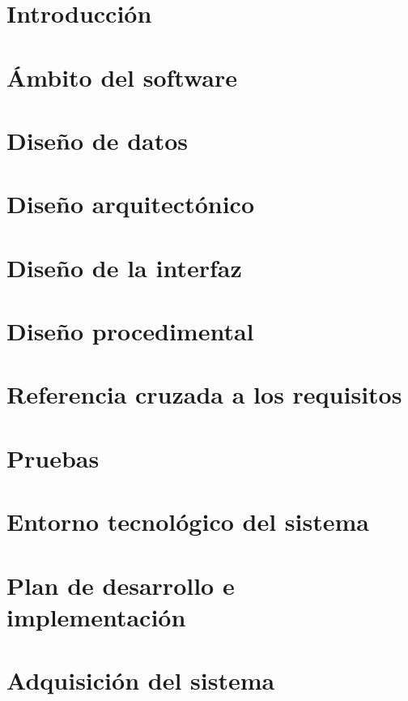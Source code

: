 \section{Introducción}
\section{Ámbito del software}
\section{Diseño de datos}
\section{Diseño arquitectónico}
\section{Diseño de la interfaz}
\section{Diseño procedimental}
\section{Referencia cruzada a los requisitos}
\section{Pruebas}
\section{Entorno tecnológico del sistema}
\section{Plan de desarrollo e implementación}




\section{Adquisición del sistema}

